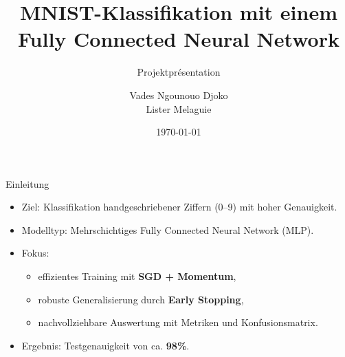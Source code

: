 \documentclass[aspectratio=169]{beamer}
\title{MNIST-Klassifikation mit einem Fully Connected Neural Network}
\subtitle{Projektpr\'esentation}
\author{Vades Ngounouo Djoko \\ Lister Melaguie}
\institute{Cours: Deep Learning}
\date{\today}
\begin{document}
\begin{frame}
  \titlepage
\end{frame}

\begin{frame}{Einleitung}
  \begin{itemize}
    \item Ziel: Klassifikation handgeschriebener Ziffern (0--9) mit hoher Genauigkeit.
    \item Modelltyp: Mehrschichtiges Fully Connected Neural Network (MLP).
    \item Fokus:
    \begin{itemize}
      \item effizientes Training mit \textbf{SGD + Momentum},
      \item robuste Generalisierung durch \textbf{Early Stopping},
      \item nachvollziehbare Auswertung mit Metriken und Konfusionsmatrix.
    \end{itemize}
    \item Ergebnis: Testgenauigkeit von ca. \textbf{98\%}.
  \end{itemize}

\end{frame}
\end{document}
